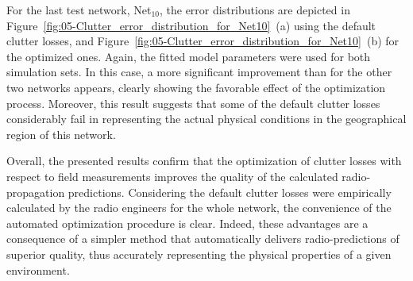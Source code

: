 For the last test network, Net$_{10}$, the error distributions are
depicted in Figure~\ref{fig:05-Clutter_error_distribution_for_Net10}~(a)
using the default clutter losses, and Figure~\ref{fig:05-Clutter_error_distribution_for_Net10}~(b)
for the optimized ones. Again, the fitted model parameters were used
for both simulation sets. In this case, a more significant improvement
than for the other two networks appears, clearly showing the favorable
effect of the optimization process. Moreover, this result suggests
that some of the default clutter losses considerably fail in representing
the actual physical conditions in the geographical region of this
network.

Overall, the presented results confirm that the optimization of clutter
losses with respect to field measurements improves the quality of
the calculated radio-propagation predictions. Considering the default
clutter losses were empirically calculated by the radio engineers
for the whole network, the convenience of the automated optimization
procedure is clear. Indeed, these advantages are a consequence of
a simpler method that automatically delivers radio-predictions of
superior quality, thus accurately representing the physical properties
of a given environment.


